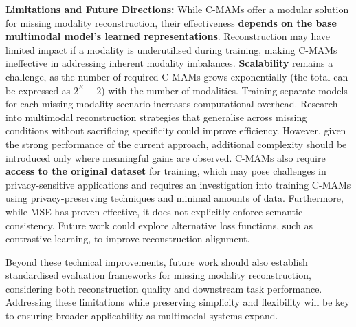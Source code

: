 \textbf{Limitations and Future Directions:} While C-MAMs offer a modular solution for missing modality reconstruction, their effectiveness \textbf{depends on the base multimodal model's learned representations}. Reconstruction may have limited impact if a modality is underutilised during training, making C-MAMs ineffective in addressing inherent modality imbalances. \textbf{Scalability} remains a challenge, as the number of required C-MAMs grows exponentially (the total can be expressed as $2^K - 2$) with the number of modalities. Training separate models for each missing modality scenario increases computational overhead. Research into multimodal reconstruction strategies that generalise across missing conditions without sacrificing specificity could improve efficiency. However, given the strong performance of the current approach, additional complexity should be introduced only where meaningful gains are observed. C-MAMs also require \textbf{access to the original dataset} for training, which may pose challenges in privacy-sensitive applications and requires an investigation into training C-MAMs using privacy-preserving techniques and minimal amounts of data. Furthermore, while MSE has proven effective, it does not explicitly enforce semantic consistency. Future work could explore alternative loss functions, such as contrastive learning, to improve reconstruction alignment. 

Beyond these technical improvements, future work should also establish standardised evaluation frameworks for missing modality reconstruction, considering both reconstruction quality and downstream task performance. Addressing these limitations while preserving simplicity and flexibility will be key to ensuring broader applicability as multimodal systems expand.
